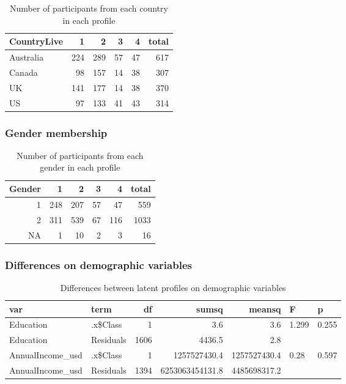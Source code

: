 \documentclass[]{article}
\begin{document}
\begin{table}[H]

\caption{\label{tab:unnamed-chunk-17}Number of participants from each country in each profile}
\centering
\fontsize{6}{8}\selectfont
\begin{tabular}[t]{lrrrrr}
\toprule
CountryLive & 1 & 2 & 3 & 4 & total\\
\midrule
Australia & 224 & 289 & 57 & 47 & 617\\
Canada & 98 & 157 & 14 & 38 & 307\\
UK & 141 & 177 & 14 & 38 & 370\\
US & 97 & 133 & 41 & 43 & 314\\
\bottomrule
\end{tabular}
\end{table}

\hypertarget{gender-membership-2}{%
\subsubsection{Gender membership}\label{gender-membership-2}}

\begin{table}[H]

\caption{\label{tab:unnamed-chunk-18}Number of participants from each gender in each profile}
\centering
\fontsize{6}{8}\selectfont
\begin{tabular}[t]{rrrrrr}
\toprule
Gender & 1 & 2 & 3 & 4 & total\\
\midrule
1 & 248 & 207 & 57 & 47 & 559\\
2 & 311 & 539 & 67 & 116 & 1033\\
NA & 1 & 10 & 2 & 3 & 16\\
\bottomrule
\end{tabular}
\end{table}

\hypertarget{differences-on-demographic-variables-2}{%
\subsubsection{Differences on demographic
variables}\label{differences-on-demographic-variables-2}}

\begin{table}[H]

\caption{\label{tab:unnamed-chunk-19}Differences between latent profiles on demographic variables}
\centering
\fontsize{6}{8}\selectfont
\begin{tabular}[t]{llrrrll}
\toprule
var & term & df & sumsq & meansq & F & p\\
\midrule
Education & .x\$Class & 1 & 3.6 & 3.6 & 1.299 & 0.255\\
Education & Residuals & 1606 & 4436.5 & 2.8 &  & \\
AnnualIncome\_usd & .x\$Class & 1 & 1257527430.4 & 1257527430.4 & 0.28 & 0.597\\
AnnualIncome\_usd & Residuals & 1394 & 6253063454131.8 & 4485698317.2 &  & \\
\bottomrule
\end{tabular}
\end{table}
\end{document}
